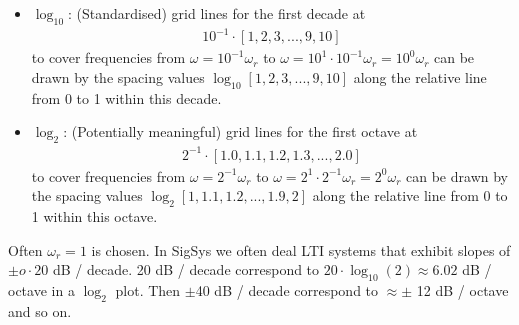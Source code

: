 \documentclass[11pt,a4paper,DIV=12]{scrartcl}
\numberwithin{equation}{section}
\numberwithin{figure}{section}
\begin{document}
\begin{center}
\end{center}



\begin{itemize}
  \item $\log_{10}$:
  (Standardised) grid lines for the first decade at
  \begin{align}
  10^{-1} \cdot [1,2,3,...,9,10]
  \end{align}
  to cover frequencies from $\omega=10^{-1} \omega_r$ to $\omega=10^1 \cdot 10^{-1} \omega_r= 10^0 \omega_r$
  can be drawn by the spacing values $\log_{10}[1,2,3,...,9,10]$
  along the relative line from 0 to 1 within this decade.
  \item $\log_{2}$:
  (Potentially meaningful) grid lines for the first octave at
  \begin{align}
  2^{-1} \cdot [1.0, 1.1, 1.2, 1.3,...,2.0]
  \end{align}
  to cover frequencies from $\omega=2^{-1} \omega_r$ to $\omega=2^1 \cdot 2^{-1} \omega_r = 2^0 \omega_r$
  can be drawn by the spacing values $\log_{2}[1,1.1,1.2,...,1.9,2]$
  along the relative line from 0 to 1 within this octave.
\end{itemize}
%
Often $\omega_r = 1$ is chosen.
In SigSys we often deal LTI systems that exhibit slopes of $\pm o \cdot 20$ dB / decade.
20 dB / decade correspond to $20\cdot \log_{10}(2) \approx 6.02$ dB / octave
in a $\log_2$ plot.
Then $\pm$40 dB / decade correspond to $\approx\pm$ 12 dB / octave and so on.





%
%
\clearpage

\end{document}
